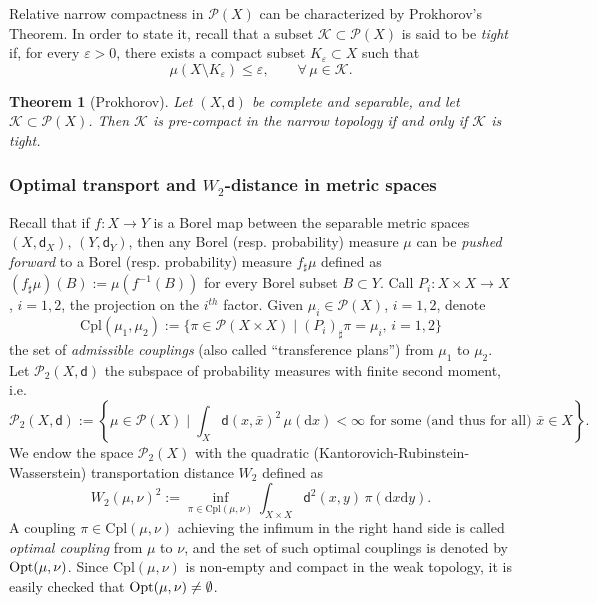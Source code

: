 \documentclass[11pt,a4paper]{article}
\theoremstyle{plain}
\newtheorem{theorem}{Theorem}[section]
\theoremstyle{definition}
\theoremstyle{remark}
\numberwithin{equation}{section}
\newcommand{\ve}{\varepsilon}
\newcommand{\Opt}{{\rm Opt}}
\newcommand{\cK}{\mathcal{K}}
\newcommand{\Cpl}{\mathrm{Cpl}}
\newcommand{\Prob}{\mathcal{P}}
\newcommand{\di}{\mathrm{d}}
\newcommand{\sfd}{\mathsf d}
\begin{document}
Relative narrow compactness in $\Prob(X)$ can be characterized by Prokhorov's Theorem. In order to state it, recall that a subset $\cK \subset \Prob(X)$ is said to be \emph{tight} if, for every $\ve>0$, there exists a compact subset $K_{\ve}\subset X$ such that
\begin{equation}
\mu(X\setminus K_{\ve})\leq \ve, \qquad \forall\, \mu\in \cK.
\end{equation}
 
\begin{theorem}[Prokhorov]\label{thm:Prok}
 Let $(X,\sfd)$ be complete and separable, and let $\cK\subset \Prob(X)$. Then $\cK$ is pre-compact in the narrow topology if and only if $\cK$ is tight.
 \end{theorem}
 
\subsubsection{Optimal transport and \texorpdfstring{$W_{2}$}{W2}-distance in metric spaces}\label{Sec:OptTransp}
Recall that if $f:X\to Y$ is a Borel map between the separable metric spaces $(X,\sfd_{X})$, $(Y,\sfd_{Y})$, then any Borel (resp. probability) measure $\mu$ can be \emph{pushed forward} to a Borel (resp. probability) measure $f_{\sharp} \mu$  defined as $(f_{\sharp} \mu)(B):=\mu(f^{-1}(B))$ for every Borel subset $B\subset Y$. Call $P_{i}:X\times X\to X$, $i=1,2$, the projection on the $i^{th}$ factor. Given $\mu_{i}\in \Prob(X)$, $i=1,2$, denote
\[
\Cpl(\mu_{1}, \mu_{2}):=\{\pi\in \Prob(X\times X) \mid (P_{i})_{\sharp} \pi=\mu_{i}, \, i=1,2 \}
\]
the set of \emph{admissible couplings} (also called ``transference plans'') from $\mu_{1}$ to $\mu_{2}$.  Let $\Prob_{2}(X,\sfd)$ the subspace of probability measures with finite second moment, i.e. 
\[
\Prob_{2}(X,\sfd):=\left\{\mu\in \Prob(X) \mid \int_{X} \sfd(x,\bar x)^{2}\, \mu(\di x)<\infty \text{ for some (and thus for all) } \bar{x}\in X \right\}.
\]
 We endow the space $\Prob_{2}(X)$ with the quadratic (Kantorovich-Rubinstein-Wasserstein) transportation distance $W_{2}$ defined as
\[
W_{2}(\mu,\nu)^{2}:= \inf_{\pi\in \Cpl(\mu,\nu)} \int_{X\times X} \sfd^{2}(x,y)\,  \pi( \di x \di y). 
\]
A coupling $\pi\in \Cpl(\mu,\nu)$ achieving the infimum in the right hand side is called \emph{optimal coupling} from $\mu$ to $\nu$, and the set of such optimal couplings is denoted by $\Opt(\mu,\nu)$. Since $\Cpl(\mu,\nu)$ is non-empty and compact in the weak topology, it is easily checked that  $\Opt(\mu,\nu)\neq \emptyset$.
\end{document}

